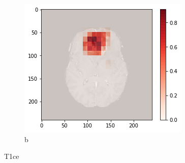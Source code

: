 \begin{figure}[H]
        \begin{subfigure}{.33\textwidth}
        \centering
        \includegraphics[width=\linewidth]{chapters/07_brats3d/images/10_t1ce_hdm.png}
        \caption{b}
    \end{subfigure}
    \caption{T1ce}
\end{figure}


